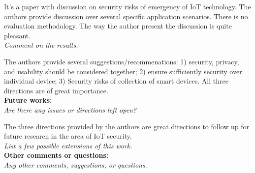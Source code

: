 \documentclass[11pt, oneside]{article}   	%
\begin{document}
It's a paper with discussion on security risks of emergency of IoT technology. The authors provide discussion over several specific application scenarios. There is no evaluation methodology. The way the author present the discussion is quite pleasant.\\

\noindent \emph{Comment on the results.}

The authors provide several suggestions/recommenations: 1) security, privacy, and usability should be considered together; 2) ensure sufficiently security over individual device; 3) Security risks of collection of smart devices. All three directions are of great importance. \\


\noindent \textbf{Future works:}\\
\emph{Are there any issues or directions left open?}

The three directions provided by the authors are great directions to follow up for future research in the area of IoT security. \\

\noindent \emph{List a few possible extensions of this work.}\\


\noindent \textbf{Other comments or questions:}\\
\emph{Any other comments, suggestions, or questions}.
\end{document}
